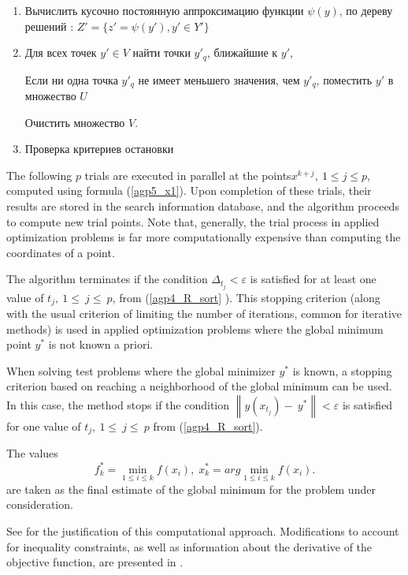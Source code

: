 \documentclass[runningheads]{llncs}
\begin{document}
\begin{enumerate}
	\item Вычислить кусочно постоянную аппроксимацию функции $\psi(y)$, по дереву решений : $Z' = \{ z'=  \psi(y'), y' \in Y'\}$
	
	\item Для всех точек $y'\in V$ найти точки $y'_q$, ближайшие к $y'$,
	
	Если ни одна точка $y'_q$ не имеет меньшего значения, чем $y'_q$, поместить $y'$ в множество $U$
	
	Очистить множество $V$.
	
	\item Проверка критериев остановки
	
	
\end{enumerate}

The following $p$ trials are executed in parallel at the points$x^{k+j},\ 1\leq j\leq p$,  computed using formula  (\ref{agp5_x1}). Upon completion of these trials, their results are stored in the search information database, and the algorithm proceeds to compute new trial points. Note that, generally, the trial process in applied optimization problems is far more computationally expensive than computing the coordinates of a point.

The algorithm terminates if the condition \(\Delta_{t_j} < \varepsilon\) is satisfied for at least one value of $t_j,\ 1\le\ j\le\ p$, from (\ref{agp4_R_sort} ). This stopping criterion (along with the usual criterion of limiting the number of iterations, common for iterative methods) is used in applied optimization problems where the global minimum point $y^*$ is not known a priori.

When solving test problems where the global minimizer $y^*$ is known, a stopping criterion based on reaching a neighborhood of the global minimum can be used. In this case, the method stops if the condition $\left\|y(x_{t_j})-\ y^\ast\right\| < \varepsilon$ is satisfied for one value of $t_j,\ 1\le\ j\le\ p$ from (\ref{agp4_R_sort}).

The values  
\begin{equation} 
	f_k^*=\min_{1\leq i \leq k}f(x_i), \; x_k^*=arg \min_{1\leq i \leq k}f(x_i). 
\end{equation} 
are taken as the final estimate of the global minimum for the problem under consideration.


See \cite{Strongin2000,Barkalov2016} for the justification of this computational approach. Modifications to account for inequality constraints, as well as information about the derivative of the objective function, are presented in \cite{Barkalov2002,Gergel1997}.
\end{document}

